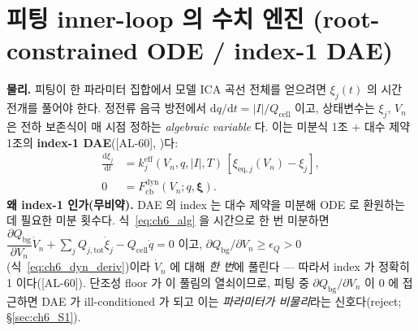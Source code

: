 \documentclass[11pt,a4paper]{article}
\newcommand{\dd}{\mathrm{d}}
\newcommand{\eff}{\mathrm{eff}}
\newcommand{\eq}{\mathrm{eq}}
\newcommand{\bg}{\mathrm{bg}}
\newcommand{\cell}{\mathrm{cell}}
\newcommand{\tot}{\mathrm{tot}}
\newcommand{\cb}{\mathrm{cb}}
\newcommand{\dyn}{\mathrm{dyn}}
\newcommand{\AL}[1]{\textsf{[AL-#1]}}
\begin{document}
\section{피팅 inner-loop 의 수치 엔진 (root-constrained ODE / index-1 DAE)}\label{sec:ch6_dae}
\textbf{물리.} 피팅이 한 파라미터 집합에서 모델 ICA 곡선 전체를 얻으려면 $\xi_j(t)$ 의 시간 전개를 풀어야 한다.
정전류 음극 방전에서 $\dd q/\dd t=|I|/Q_\cell$ 이고, 상태변수는 $\xi_j$, $V_n$ 은 전하 보존식이 매 시점 정하는
\emph{algebraic variable} 다. 이는 미분식 1조 $+$ 대수 제약 1조의 \textbf{index-1 DAE}(\AL{60},
\cite{brenan1996,hindmarsh2005})다:
\begin{align}
\frac{\dd\xi_j}{\dd t}&=k_j^{\eff}(V_n,q,|I|,T)\,[\xi_{\eq,j}(V_n)-\xi_j],\label{eq:ch6_ode}\\
0&=F_\cb^\dyn(V_n;q,\bm\xi).\label{eq:ch6_alg}
\end{align}
\textbf{왜 index-1 인가(무비약).} DAE 의 index 는 대수 제약을 미분해 ODE 로 환원하는 데 필요한 미분 횟수다.
식~\eqref{eq:ch6_alg} 을 시간으로 한 번 미분하면 $\dfrac{\partial Q_\bg}{\partial V_n}\dot V_n+\sum_j Q_{j,\tot}
\dot\xi_j-Q_\cell\dot q=0$ 이고, $\partial Q_\bg/\partial V_n\ge\epsilon_Q>0$(식~\eqref{eq:ch6_dyn_deriv})이라
$\dot V_n$ 에 대해 \emph{한 번}에 풀린다 — 따라서 index 가 정확히 1 이다(\AL{60}). 단조성 floor 가 이 풀림의
열쇠이므로, 피팅 중 $\partial Q_\bg/\partial V_n$ 이 0 에 접근하면 DAE 가 ill-conditioned 가 되고 이는
\emph{파라미터가 비물리}라는 신호다(reject; \S\ref{sec:ch6_S1}).
\end{document}
